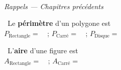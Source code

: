 \documentclass[a4paper,11pt]{article}
\newcommand{\bl}[1][4cm]{\,\makebox[#1]{\dotfill}\,}
\newcommand{\coeurrappel}{\textcolor{Couleur6}{\faHeart}\ }
\begin{document}
\vspace{0.3cm}
\noindent{\textcolor{Couleur8}{\rule{\textwidth}{0.5pt}}}\\
{\small\textit{\textcolor{Couleur8}{Rappels --- Chapitres pr\'ec\'edents}}}
\vspace{0.1cm}

\noindent \coeurrappel Le \textbf{p\'erim\`etre} d'un polygone est \dotfill\\[4pt]
$P_{\text{Rectangle}} = $ \bl[4cm] \quad ; \quad $P_{\text{Carr\'e}} = $ \bl[3cm] \quad ; \quad $P_{\text{Disque}} = $ \bl[4cm]

\noindent \coeurrappel L'\textbf{aire} d'une figure est \dotfill\\[4pt]
$A_{\text{Rectangle}} = $ \bl[4cm] \quad ; \quad $A_{\text{Carr\'e}} = $ \bl[4cm]
\end{document}
